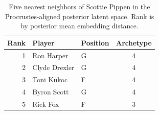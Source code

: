 \begin{table}[htbp]
  \centering\small
  \begin{tabular}{rllc}
    \toprule
    Rank & Player & Position & Archetype \\
    \midrule
    1 & Ron Harper & G & 4 \\
    2 & Clyde Drexler & G & 4 \\
    3 & Toni Kukoc & F & 4 \\
    4 & Byron Scott & G & 4 \\
    5 & Rick Fox & F & 3 \\
    \bottomrule
  \end{tabular}
  \caption{Five nearest neighbors of Scottie Pippen in the Procrustes-aligned posterior latent space. Rank is by posterior mean embedding distance.}
  \label{tab:Scottie_Pippen_neighbors}
\end{table}

